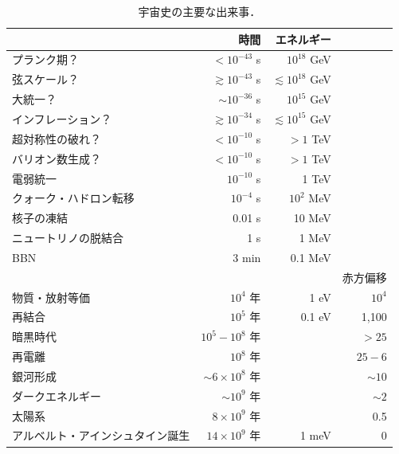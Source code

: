 \begin{table}[h!]
\caption{宇宙史の主要な出来事．}
\label{tab:timeline}
\begin{center}
\begin{tabular}{l | r | r | r}
 & {\small 時間} & {\small エネルギー} & \\
 \hline 
 \hline
 {\small プランク期？} & {\small $< 10^{-43}$ s} & {\small $10^{18}$ GeV} &\\
 {\small 弦スケール？} & {\small $\gtrsim 10^{-43}$ s} & {\small $\lesssim 10^{18}$ GeV} & \\
{\small 大統一？} & {\small $\sim 10^{-36}$ s} & {\small $10^{15}$ GeV} & \\
{\small インフレーション？} & {\small $\gtrsim 10^{-34}$ s} & {\small $\lesssim 10^{15}$ GeV} &\\
{\small 超対称性の破れ？} & {\small $< 10^{-10}$ s} & {\small $> 1$ TeV} &\\
{\small バリオン数生成？} & {\small $< 10^{-10}$ s} & {\small $> 1$ TeV} &\\
\hline
\hline
{\small 電弱統一} & {\small $10^{-10}$ s} & {\small 1 TeV} &\\
{\small クォーク・ハドロン転移} & {\small $10^{-4}$ s} & {\small $10^2$ MeV} &\\
{\small 核子の凍結} & {\small 0.01 s} & {\small 10 MeV} &\\
{\small ニュートリノの脱結合} & {\small 1 s} & {\small 1 MeV} &\\
{\small BBN} & {\small 3 min} & {\small 0.1 MeV} &\\
\hline 
\hline
& & & {\small 赤方偏移} \\
\hline 
\hline
{\small 物質・放射等価} & {\small $10^4$ 年} & {\small 1 eV} & {\small $10^4$}\\
{\small 再結合} & {\small $10^5$ 年} & {\small 0.1 eV} & {\small 1,100}\\
{\small 暗黒時代} & {\small $10^5 - 10^8$ 年} & & {\small $> 25$} \\
{\small 再電離} & {\small $10^8$ 年} & & {\small $25 - 6$}\\
{\small 銀河形成} & {\small $\sim 6 \times 10^8$ 年} & & {\small $\sim 10$} \\
{\small ダークエネルギー} & {\small $\sim 10^9$ 年} & & {\small $\sim 2$} \\
{\small 太陽系} & {\small $8 \times 10^9$ 年} & & {\small 0.5} \\
{\small アルベルト・アインシュタイン誕生} & {\small $14 \times 10^{9}$ 年} & {\small 1 meV} & {\small 0} \\
\hline
\end{tabular}
  \end{center}
\end{table}

